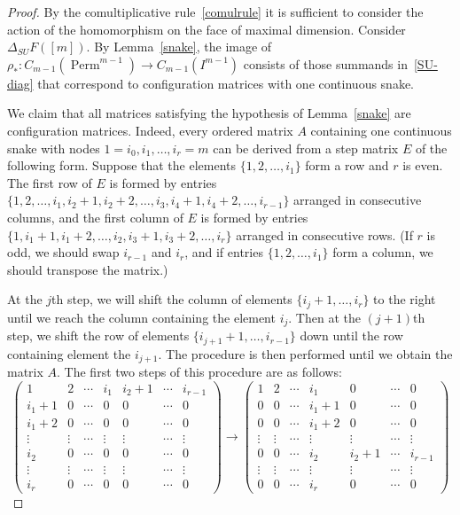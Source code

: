 \documentclass[10pt,a4paper]{amsart}
\DeclareMathOperator{\Perm}{Perm}
\begin{document}
\begin{proof}
By the comultiplicative rule~\eqref{comulrule} it is sufficient to consider the action of the homomorphism on the face of maximal dimension.
Consider $\Delta_{SU}F([m])$. By Lemma~\ref{snake}, the image of $\rho_* \colon C_{m-1}(\Perm^{m-1}) \to C_{m-1}(I^{m-1})$ consists of those
summands in~\eqref{SU-diag} that correspond to configuration matrices with one continuous snake.

We claim that all matrices satisfying the hypothesis of Lemma~\ref{snake} are configuration matrices.
Indeed, every ordered matrix $A$ containing one continuous snake with nodes $1=i_0, i_1, \ldots, i_r = m$ can be derived from a step matrix $E$ of the following form. 
Suppose that the elements $\{1, 2, \ldots, i_1 \}$ form a row and $r$ is even.
The first row of $E$ is formed by entries $\{1, 2, \ldots, i_1, i_2+1, i_2 + 2, \ldots, i_3, i_4+1, i_4 + 2, \ldots, i_{r - 1}\}$ arranged in consecutive columns, and the first column of $E$ is formed by entries
$\{1, i_1 + 1, i_1 + 2, \ldots, i_2, i_3 + 1, i_3 + 2, \ldots, i_r \}$ arranged in consecutive rows. (If $r$ is odd, we should swap $i_{r-1}$ and $i_r$, and if entries $\{1, 2, \ldots, i_1 \}$ form a column, we should transpose the matrix.)

At the $j$th step, we will shift the column of elements $\{i_j + 1, \ldots, i_r \}$ to the right until we reach the column containing the element $i_j$. Then at the $(j+1)$th step, we shift the row of elements $\{i_{j+1} + 1, \ldots, i_{r-1} \}$ down until the row containing element the $i_{j+1}$. The procedure is then performed until we obtain the matrix $A$. The first two steps of this procedure are as follows:
$$\begin{pmatrix}
1 & 2 & \cdots & i_1 & i_2 + 1 & \cdots & i_{r-1} \\
i_1 + 1 & 0 & \cdots & 0 & 0 & \cdots & 0 \\
i_1 + 2 & 0 & \cdots & 0 & 0 & \cdots & 0 \\
\vdots & \vdots & \cdots & \vdots & \vdots & \cdots & \vdots\\
i_2 & 0 & \cdots & 0 & 0 & \cdots & 0 \\
\vdots & \vdots & \cdots & \vdots & \vdots & \cdots & \vdots \\
i_{r} & 0 & \cdots & 0 & 0 & \cdots & 0 
\end{pmatrix} \to
\begin{pmatrix}
1 & 2 & \cdots & i_1 & 0 & \cdots & 0 \\
0 & 0 & \cdots & i_1 + 1 & 0 & \cdots & 0 \\
0 & 0 & \cdots & i_1 + 2 & 0 & \cdots & 0 \\
\vdots & \vdots & \cdots & \vdots & \vdots & \cdots & \vdots\\
0 & 0 & \cdots & i_2 & i_2 + 1 & \cdots & i_{r-1} \\
\vdots & \vdots & \cdots & \vdots & \vdots & \cdots & \vdots \\
0 & 0 & \cdots & i_{r} & 0 & \cdots & 0 
\end{pmatrix}$$


\end{proof}
\end{document}
